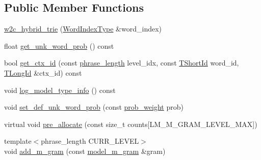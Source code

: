 \subsection*{Public Member Functions}
\begin{DoxyCompactItemize}
\item 
\hyperlink{classuva_1_1smt_1_1bpbd_1_1server_1_1lm_1_1w2c__hybrid__trie_af7088cdf8ac483798132145ee7b4e18b}{w2c\+\_\+hybrid\+\_\+trie} (\hyperlink{classuva_1_1smt_1_1bpbd_1_1server_1_1lm_1_1word__index__trie__base_a64279b5b94c421b25aedaa72e73d013c}{Word\+Index\+Type} \&word\+\_\+index)
\item 
float \hyperlink{classuva_1_1smt_1_1bpbd_1_1server_1_1lm_1_1w2c__hybrid__trie_a1bab17298e1d7b76f1dd27461a890912}{get\+\_\+unk\+\_\+word\+\_\+prob} () const 
\item 
bool \hyperlink{classuva_1_1smt_1_1bpbd_1_1server_1_1lm_1_1w2c__hybrid__trie_ad39f7abe99e50415083a94417f7f71b1}{get\+\_\+ctx\+\_\+id} (const \hyperlink{namespaceuva_1_1smt_1_1bpbd_1_1server_af068a19c2e03116caf3e3827a3e40e35}{phrase\+\_\+length} level\+\_\+idx, const \hyperlink{namespaceuva_1_1smt_1_1bpbd_1_1server_1_1lm_1_1identifiers_a33043a191e9a637dea742a89d23c8bdc}{T\+Short\+Id} word\+\_\+id, \hyperlink{namespaceuva_1_1smt_1_1bpbd_1_1server_1_1lm_1_1identifiers_a6841847096e455ad3c38689bc548b3b0}{T\+Long\+Id} \&ctx\+\_\+id) const 
\item 
void \hyperlink{classuva_1_1smt_1_1bpbd_1_1server_1_1lm_1_1w2c__hybrid__trie_a39ef157122a1c643bb47cbe9a049b9d8}{log\+\_\+model\+\_\+type\+\_\+info} () const 
\item 
void \hyperlink{classuva_1_1smt_1_1bpbd_1_1server_1_1lm_1_1w2c__hybrid__trie_acf87032dc4244e9404378ae4e614bbf5}{set\+\_\+def\+\_\+unk\+\_\+word\+\_\+prob} (const \hyperlink{namespaceuva_1_1smt_1_1bpbd_1_1server_a01e9ea4de9c226f4464862e84ff0bbcc}{prob\+\_\+weight} prob)
\item 
virtual void \hyperlink{classuva_1_1smt_1_1bpbd_1_1server_1_1lm_1_1w2c__hybrid__trie_ad24feeb24ce1770641b4b42ad40970da}{pre\+\_\+allocate} (const size\+\_\+t counts\mbox{[}L\+M\+\_\+\+M\+\_\+\+G\+R\+A\+M\+\_\+\+L\+E\+V\+E\+L\+\_\+\+M\+A\+X\mbox{]})
\item 
{\footnotesize template$<$phrase\+\_\+length C\+U\+R\+R\+\_\+\+L\+E\+V\+E\+L$>$ }\\void \hyperlink{classuva_1_1smt_1_1bpbd_1_1server_1_1lm_1_1w2c__hybrid__trie_ad192b8a3eda2fbd3907001b4b4dedbd1}{add\+\_\+m\+\_\+gram} (const \hyperlink{classuva_1_1smt_1_1bpbd_1_1server_1_1lm_1_1m__grams_1_1model__m__gram}{model\+\_\+m\+\_\+gram} \&gram)

\end{DoxyCompactItemize}
